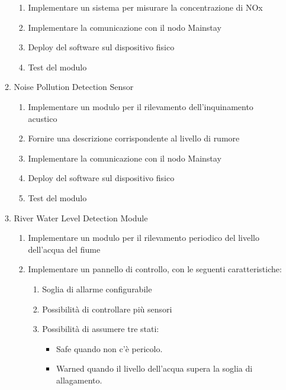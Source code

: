 \begin{enumerate}
\begin{enumerate}
\begin{enumerate}
                        \item Implementare un sistema per misurare la concentrazione di NOx
                        \item Implementare la comunicazione con il nodo Mainstay
                        \item Deploy del software sul dispositivo fisico
                        \item Test del modulo
                    \end{enumerate}
              \item Noise Pollution Detection Sensor
                    \begin{enumerate}
                        \item Implementare un modulo per il rilevamento dell'inquinamento acustico
                        \item Fornire una descrizione corrispondente al livello di rumore
                        \item Implementare la comunicazione con il nodo Mainstay
                        \item Deploy del software sul dispositivo fisico
                        \item Test del modulo
                    \end{enumerate}
              \item River Water Level Detection Module
                    \begin{enumerate}
                        \item Implementare un modulo per il rilevamento periodico del livello dell'acqua del fiume
                        \item Implementare un pannello di controllo, con le seguenti caratteristiche:
                              \begin{enumerate}
                                  \item Soglia di allarme configurabile
                                  \item Possibilità di controllare più sensori
                                  \item Possibilità di assumere tre stati:
                                        \begin{itemize}
                                            \item Safe quando non c'è pericolo.
                                            \item Warned quando il livello dell'acqua supera la soglia di allagamento.

\end{itemize}
\end{enumerate}
\end{enumerate}
\end{enumerate}
\end{enumerate}
